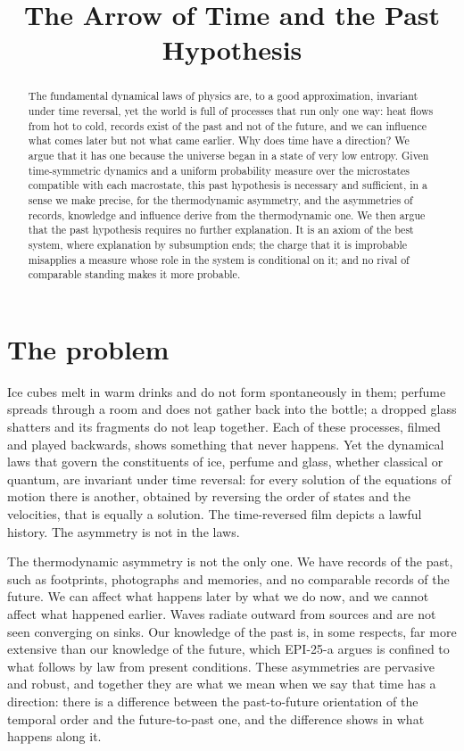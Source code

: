 \documentclass{situationist-preprint}
\title{The Arrow of Time and the Past Hypothesis}
\begin{document}
\maketitle

\begin{abstract}
The fundamental dynamical laws of physics are, to a good approximation, invariant under time reversal, yet the world is full of processes that run only one way: heat flows from hot to cold, records exist of the past and not of the future, and we can influence what comes later but not what came earlier. Why does time have a direction? We argue that it has one because the universe began in a state of very low entropy. Given time-symmetric dynamics and a uniform probability measure over the microstates compatible with each macrostate, this past hypothesis is necessary and sufficient, in a sense we make precise, for the thermodynamic asymmetry, and the asymmetries of records, knowledge and influence derive from the thermodynamic one. We then argue that the past hypothesis requires no further explanation. It is an axiom of the best system, where explanation by subsumption ends; the charge that it is improbable misapplies a measure whose role in the system is conditional on it; and no rival of comparable standing makes it more probable.
\end{abstract}

\section{The problem}\label{s:problem}

Ice cubes melt in warm drinks and do not form spontaneously in them; perfume spreads through a room and does not gather back into the bottle; a dropped glass shatters and its fragments do not leap together. Each of these processes, filmed and played backwards, shows something that never happens. Yet the dynamical laws that govern the constituents of ice, perfume and glass, whether classical or quantum, are invariant under time reversal: for every solution of the equations of motion there is another, obtained by reversing the order of states and the velocities, that is equally a solution. The time-reversed film depicts a lawful history. The asymmetry is not in the laws.

The thermodynamic asymmetry is not the only one. We have records of the past, such as footprints, photographs and memories, and no comparable records of the future. We can affect what happens later by what we do now, and we cannot affect what happened earlier. Waves radiate outward from sources and are not seen converging on sinks. Our knowledge of the past is, in some respects, far more extensive than our knowledge of the future, which EPI-25-a argues is confined to what follows by law from present conditions. These asymmetries are pervasive and robust, and together they are what we mean when we say that time has a direction: there is a difference between the past-to-future orientation of the temporal order and the future-to-past one, and the difference shows in what happens along it.
\end{document}
